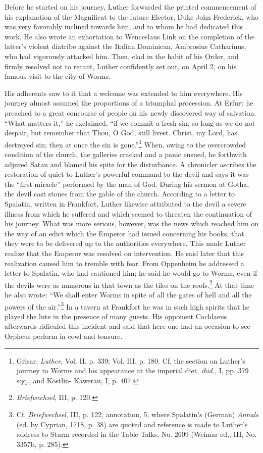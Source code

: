 Before he started on his journey, Luther forwarded the printed
commencement of his explanation of the Magnificat to the future
Elector, Duke John Frederick, who was very favorably inclined
towards him, and to whom
he had dedicated this work. He also wrote
an exhortation to Wenceslaus Link on the completion of the latter’s
violent diatribe against the Italian Dominican, Ambrosius Catharinus,
who had vigorously attacked him. Then, clad in the habit of his Order,
and firmly resolved not to recant, Luther confidently set out,
on April 2, on his famous visit to the city of Worms.

His adherents saw to it that a welcome was extended to him everywhere.
His journey almost assumed the proportions of a triumphal
procession. At Erfurt he preached to a great concourse of people on
his newly discovered way of salvation. “What matters it,” he exclaimed,
“if we commit a fresh sin, so long as we do not despair, but
remember that Thou, O God, still livest. Christ, my Lord, has destroyed
sin; then at once the sin is gone.”\footnote
{Grisar, \textit{Luther}, Vol. II, p. 339; Vol. III, p. 180. Cf. the section on Luther’s journey
to Worms and his appearance at the imperial diet, \textit{ibid.}, I, pp. 379 sqq., and Köstlin-
Kawerau, I, p. 407.}
When, owing to the overcrowded condition
of the church, the galleries cracked and a panic
ensued, he forthwith adjured Satan and blamed his spite for the disturbance.
A chronicler ascribes the restoration of quiet to Luther’s
powerful command to the devil and says it was the “first miracle”
performed by the man of God. During his sermon at Gotha, the
devil cast stones from the gable of the church. According to a letter
to Spalatin, written in Frankfort, Luther likewise attributed to the
devil a severe illness from which he suffered and which seemed to
threaten the continuation of his journey. What was more serious,
however, was the news which reached him on the way of an edict
which the Emperor had issued concerning his books, that they were to
be delivered up to the authorities everywhere. This made Luther realize
that the Emperor was resolved on intervention. He said later that
this realization caused him to tremble with fear. From Oppenheim
he addressed a letter-to Spalatin, who had cautioned him; he said he
would go to Worms, even if the devils were as numerous in that town
as the tiles on the roofs.\footnote{\textit{Briefwechsel}, III, p. 120.}
At that time he also wrote: “We shall enter
Worms in spite of all the gates of hell and all the powers of the
air.”\footnote
{Cf. \textit{Briefwechsel}, III, p. 122, annotation, 5, where Spalatin’s (German) \textit{Annals} (ed. by
Cyprian, 1718, p. 38) are quoted and reference is made to Luther’s address to Sturm recorded
in the Table Talks, No. 2609 (Weimar ed,, III, No. 3357b, p. 285).}
In a tavern at Frankfort he was in such high spirits that he
played the lute in the presence of many guests. His opponent Cochlaeus afterwards
ridiculed this incident and said that here one had an
occasion to see Orpheus perform in cowl and tonsure.

